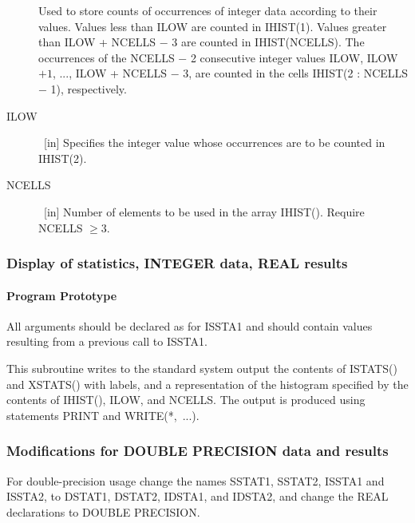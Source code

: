\documentclass[twoside]{MATH77}
\begin{document}
\begin{description}
Used to store counts of occurrences of integer data according to their
values. Values less than ILOW are counted in IHIST(1). Values greater than
ILOW + NCELLS $-$ 3 are counted in IHIST(NCELLS). The occurrences of the
NCELLS $-$ 2 consecutive integer values ILOW, ILOW $+1$, ..., ILOW + NCELLS $%
-$ 3, are counted in the cells IHIST(2 : NCELLS $-$ 1),
respectively.

\item[ILOW]  \ [in] Specifies the integer value whose occurrences are to be
counted in IHIST(2).

\item[NCELLS]  \ [in] Number of elements to be used in the array IHIST().
Require NCELLS $\geq 3.$
\end{description}

\subsubsection{Display of statistics, INTEGER data, REAL results}

\paragraph{Program Prototype}

All arguments should be declared as for ISSTA1 and should contain values
resulting from a previous call to ISSTA1.

\begin{center}
\end{center}

This subroutine writes to the standard system output the
contents of ISTATS() and XSTATS() with labels, and a representation
of the histogram specified by the contents of IHIST(), ILOW, and
NCELLS.  The output is produced using statements PRINT and WRITE(*,~...).

\subsubsection{Modifications for DOUBLE PRECISION data and results}

For double-precision usage change the names SSTAT1, SSTAT2, ISSTA1
and ISSTA2, to DSTAT1, DSTAT2, IDSTA1, and IDSTA2, and change the
REAL declarations to DOUBLE PRECISION.
\end{document}
